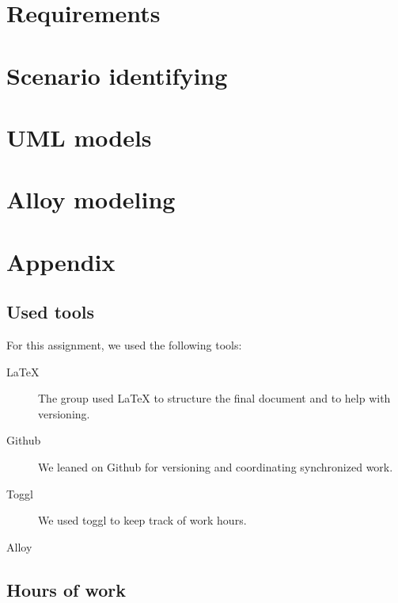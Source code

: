 \documentclass{article}
\begin{document}
	\newpage
	\section{Requirements}

	\newpage
	\section{Scenario identifying}

	\newpage
	\section{UML models}

	\newpage
	\section{Alloy modeling}

	\newpage
	\section{Appendix}
		\listoffigures
		\listoftables
		
		\subsection{Used tools}
		For this assignment, we used the following tools:
		
		\begin{description}
			\item [LaTeX] The group used LaTeX to structure the final document and to help with versioning.
			\item [Github] We leaned on Github for versioning and coordinating synchronized work.
			\item [Toggl] We used toggl to keep track of work hours.
			\item [Alloy]
		\end{description}
		
		\subsection{Hours of work}
\end{document}
